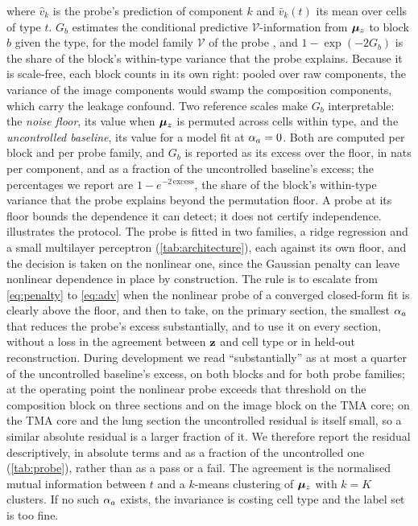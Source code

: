 where $\hat v_k$ is the probe's prediction of component $k$ and $\bar v_k(t)$ its mean over cells of type $t$. $G_b$ estimates the conditional predictive $\mathcal{V}$-information from $\boldsymbol{\mu}_z$ to block $b$ given the type, for the model family $\mathcal{V}$ of the probe \citep{xu2020vinfo}, and $1 - \exp(-2G_b)$ is the share of the block's within-type variance that the probe explains. Because it is scale-free, each block counts in its own right: pooled over raw components, the variance of the image components would swamp the composition components, which carry the leakage confound. Two reference scales make $G_b$ interpretable: the \emph{noise floor}, its value when $\boldsymbol{\mu}_z$ is permuted across cells within type, and the \emph{uncontrolled baseline}, its value for a model fit at $\alpha_a = 0$. Both are computed per block and per probe family, and $G_b$ is reported as its excess over the floor, in nats per component, and as a fraction of the uncontrolled baseline's excess; the percentages we report are $1 - e^{-2\,\mathrm{excess}}$, the share of the block's within-type variance that the probe explains beyond the permutation floor. A probe at its floor bounds the dependence it can detect; it does not certify independence.  illustrates the protocol. The probe is fitted in two families, a ridge regression and a small multilayer perceptron (\cref{tab:architecture}), each against its own floor, and the decision is taken on the nonlinear one, since the Gaussian penalty can leave nonlinear dependence in place by construction. The rule is to escalate from \cref{eq:penalty} to \cref{eq:adv} when the nonlinear probe of a converged closed-form fit is clearly above the floor, and then to take, on the primary section, the smallest $\alpha_a$ that reduces the probe's excess substantially, and to use it on every section, without a loss in the agreement between $\mathbf{z}$ and cell type or in held-out reconstruction. During development we read ``substantially'' as at most a quarter of the uncontrolled baseline's excess, on both blocks and for both probe families; at the operating point the nonlinear probe exceeds that threshold on the composition block on three sections and on the image block on the TMA core; on the TMA core and the lung section the uncontrolled residual is itself small, so a similar absolute residual is a larger fraction of it. We therefore report the residual descriptively, in absolute terms and as a fraction of the uncontrolled one (\cref{tab:probe}), rather than as a pass or a fail. The agreement is the normalised mutual information \citep{strehl2002} between $t$ and a $k$-means clustering of $\boldsymbol{\mu}_z$ with $k = K$ clusters. If no such $\alpha_a$ exists, the invariance is costing cell type and the label set is too fine. 

